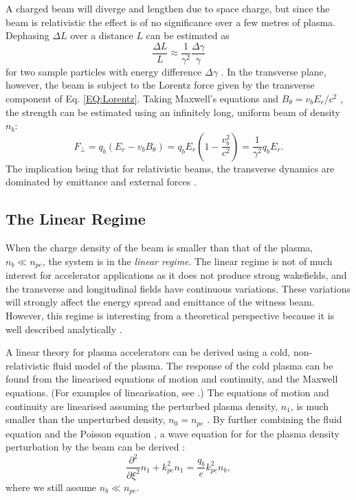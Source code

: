 A charged beam will diverge and lengthen due to space charge, but since the beam is relativistic the effect is of no significance over a few metres of plasma. Dephasing $\Delta L$ over a distance $L$ can be estimated as
\begin{equation}
    \frac{\Delta L}{L} \approx \frac{1}{\gamma^{2}}\frac{\Delta\gamma}{\gamma} \label{EQ:DePhL}
\end{equation}
for two sample particles with energy difference $\Delta\gamma$ \cite{muggli:2017}. In the transverse plane, however, the beam is subject to the Lorentz force given by the transverse component of Eq. \ref{EQ:Lorentz}. Taking Maxwell's equations and $B_{\theta} = v_{b}E_{r}/c^{2}$ \cite{schindl:1999}, the strength can be estimated using an infinitely long, uniform beam of density $n_{b}$:
\begin{equation}
    F_{\perp} = q_{b}(E_{r} - v_{b}B_{\theta})
              = q_{b}E_{r}\left(1 - \frac{v_{b}^{2}}{c^{2}}\right)
              = \frac{1}{\gamma^2}q_{b}E_{r}. \label{EQ:DeFocR}
\end{equation}
The implication being that for relativistic beams, the transverse dynamics are dominated by emittance and external forces \cite{muggli:2017}.

\subsection{The Linear Regime}
\label{Int:BPI:Lin}

When the charge density of the beam is smaller than that of the plasma, $n_{b} \ll n_{pe}$, the system is in the \textit{linear regime}. The linear regime is not of much interest for accelerator applications as it does not produce strong wakefields, and the transverse and longitudinal fields have continuous variations. These variations will strongly affect the energy spread and emittance of the witness beam. However, this regime is interesting from a theoretical perspective because it is well described analytically \cite{muggli:2017}.

A linear theory for plasma accelerators can be derived using a cold, non-relativistic fluid model of the plasma. The response of the cold plasma can be found from the linearised equations of motion and continuity, and the Maxwell equations. (For examples of linearisation, see \cite{pecseli:2012,chen:1974}.) The equations of motion and continuity are linearised assuming the perturbed plasma density, $n_{1}$, is much smaller than the unperturbed density, $n_{0} = n_{pe}$ \cite{chen:1987}. By further combining the fluid equation and the Poisson equation \cite{katsouleas:1987}, a wave equation for for the plasma density perturbation by the beam can be derived \cite{chen:1987,muggli:2017}:
\begin{equation}
    \frac{\partial^{2}}{\partial\xi^{2}}n_{1} + k_{pe}^{2}n_{1} = \frac{q_{b}}{e}k_{pe}^{2}n_{b}, \label{EQ:BeamPlasmaWF}
\end{equation}
where we still assume $n_{b} \ll n_{pe}$.


